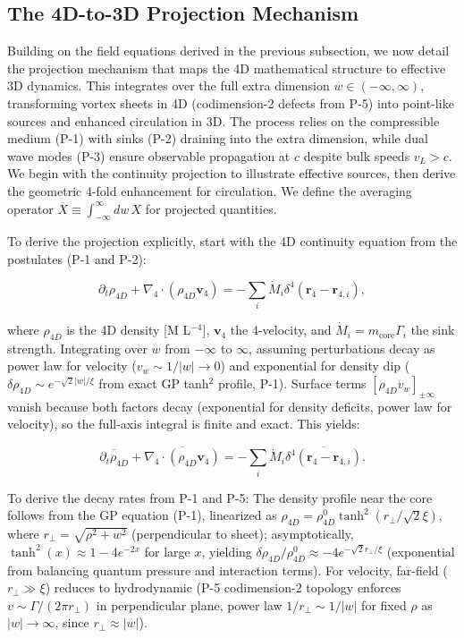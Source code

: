 \subsection{The 4D-to-3D Projection Mechanism}
\label{sec:projection}

Building on the field equations derived in the previous subsection, we now detail the projection mechanism that maps the 4D mathematical structure to effective 3D dynamics. This integrates over the full extra dimension $w \in (-\infty, \infty)$, transforming vortex sheets in 4D (codimension-2 defects from P-5) into point-like sources and enhanced circulation in 3D. The process relies on the compressible medium (P-1) with sinks (P-2) draining into the extra dimension, while dual wave modes (P-3) ensure observable propagation at $c$ despite bulk speeds $v_L > c$. We begin with the continuity projection to illustrate effective sources, then derive the geometric 4-fold enhancement for circulation. We define the averaging operator $\overline{X} \equiv \int_{-\infty}^{\infty} dw \, X$ for projected quantities.

To derive the projection explicitly, start with the 4D continuity equation from the postulates (P-1 and P-2):

\begin{equation}
\partial_t \rho_{4D} + \nabla_4 \cdot (\rho_{4D} \mathbf{v}_4) = -\sum_i \dot{M}_i \delta^4(\mathbf{r}_4 - \mathbf{r}_{4,i}),
\end{equation}

where $\rho_{4D}$ is the 4D density [M L$^{-4}$], $\mathbf{v}_4$ the 4-velocity, and $\dot{M}_i = m_{\text{core}} \Gamma_i$ the sink strength. Integrating over $w$ from $-\infty$ to $\infty$, assuming perturbations decay as power law for velocity ($v_w \sim 1/|w| \to 0$) and exponential for density dip ($\delta \rho_{4D} \sim e^{-\sqrt{2} |w|/\xi}$ from exact GP tanh$^2$ profile, P-1). Surface terms $[\rho_{4D} v_w]_{\pm \infty}$ vanish because both factors decay (exponential for density deficits, power law for velocity), so the full-axis integral is finite and exact. This yields:

\[
\overline{\partial_t \rho_{4D}} + \overline{\nabla_4 \cdot (\rho_{4D} \mathbf{v}_4)} = -\sum_i \dot{M}_i \overline{\delta^4(\mathbf{r}_4 - \mathbf{r}_{4,i})}.
\]

To derive the decay rates from P-1 and P-5: The density profile near the core follows from the GP equation (P-1), linearized as $\rho_{4D} = \rho_{4D}^0 \tanh^2 (r_\perp / \sqrt{2} \xi)$, where $r_\perp = \sqrt{\rho^2 + w^2}$ (perpendicular to sheet); asymptotically, $\tanh^2(x) \approx 1 - 4 e^{-2x}$ for large $x$, yielding $\delta \rho_{4D} / \rho_{4D}^0 \approx -4 e^{-\sqrt{2} r_\perp / \xi}$ (exponential from balancing quantum pressure and interaction terms). For velocity, far-field ($r_\perp \gg \xi$) reduces to hydrodynamic (P-5 codimension-2 topology enforces $v \sim \Gamma / (2\pi r_\perp)$ in perpendicular plane, power law $1/r_\perp \sim 1/|w|$ for fixed $\rho$ as $|w| \to \infty$, since $r_\perp \approx |w|$).

